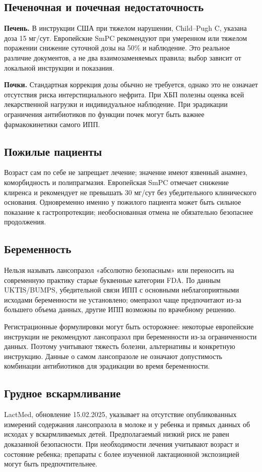 \documentclass[11pt,a4paper,notitlepage]{report}
\newcommand{\src}[1]{\unskip\space\cite{#1}}
\begin{document}
\subsection{Печеночная и почечная недостаточность}
\textbf{Печень.} В инструкции США при тяжелом нарушении, Child--Pugh C, указана доза 15 мг/сут. Европейские SmPC рекомендуют при умеренном или тяжелом поражении снижение суточной дозы на 50\% и наблюдение. Это реальное различие документов, а не два взаимозаменяемых правила; выбор зависит от локальной инструкции и показания.\src{uslabel,emc}

\textbf{Почки.} Стандартная коррекция дозы обычно не требуется, однако это не означает отсутствия риска интерстициального нефрита. При ХБП полезны оценка всей лекарственной нагрузки и индивидуальное наблюдение. При эрадикации ограничения антибиотиков по функции почек могут быть важнее фармакокинетики самого ИПП.\src{hpra,uslabel}

\subsection{Пожилые пациенты}
Возраст сам по себе не запрещает лечение; значение имеют язвенный анамнез, коморбидность и полипрагмазия. Европейская SmPC отмечает снижение клиренса и рекомендует не превышать 30 мг/сут без убедительного клинического основания. Одновременно именно у пожилого пациента может быть сильное показание к гастропротекции; необоснованная отмена не обязательно безопаснее продолжения.\src{emc,agadepres}

\subsection{Беременность}
Нельзя называть лансопразол «абсолютно безопасным» или переносить на современную практику старые буквенные категории FDA. По данным UKTIS/BUMPS, убедительной связи ИПП с основными неблагоприятными исходами беременности не установлено; омепразол чаще предпочитают из-за большего объема данных, другие ИПП возможны по врачебному решению.\src{uktis}

Регистрационные формулировки могут быть осторожнее: некоторые европейские инструкции не рекомендуют лансопразол при беременности из-за ограниченности данных. Поэтому учитывают тяжесть болезни, альтернативы и конкретную инструкцию. Данные о самом лансопразоле не означают допустимость комбинации антибиотиков для эрадикации во время беременности.\src{emc,uktis}

\subsection{Грудное вскармливание}
LactMed, обновление 15.02.2025, указывает на отсутствие опубликованных измерений содержания лансопразола в молоке и у ребенка и прямых данных об исходах у вскармливаемых детей. Предполагаемый низкий риск не равен доказанной безопасности. При необходимости лечения учитывают возраст и состояние ребенка; препараты с более изученной лактационной экспозицией могут быть предпочтительнее.\src{lactmed}
\end{document}

